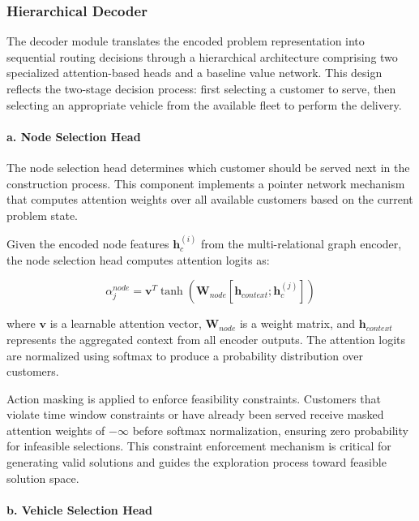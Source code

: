 \subsubsection{Hierarchical Decoder}

The decoder module translates the encoded problem representation into sequential routing decisions through a hierarchical architecture comprising two specialized attention-based heads and a baseline value network. This design reflects the two-stage decision process: first selecting a customer to serve, then selecting an appropriate vehicle from the available fleet to perform the delivery.

\paragraph{a. Node Selection Head}

The node selection head determines which customer should be served next in the construction process. This component implements a pointer network mechanism that computes attention weights over all available customers based on the current problem state.

Given the encoded node features $\mathbf{h}_c^{(i)}$ from the multi-relational graph encoder, the node selection head computes attention logits as:

\begin{equation}
\alpha_j^{node} = \mathbf{v}^T \tanh(\mathbf{W}_{node}[\mathbf{h}_{context}; \mathbf{h}_c^{(j)}])
\end{equation}

where $\mathbf{v}$ is a learnable attention vector, $\mathbf{W}_{node}$ is a weight matrix, and $\mathbf{h}_{context}$ represents the aggregated context from all encoder outputs. The attention logits are normalized using softmax to produce a probability distribution over customers.

Action masking is applied to enforce feasibility constraints. Customers that violate time window constraints or have already been served receive masked attention weights of $-\infty$ before softmax normalization, ensuring zero probability for infeasible selections. This constraint enforcement mechanism is critical for generating valid solutions and guides the exploration process toward feasible solution space.

\paragraph{b. Vehicle Selection Head}

